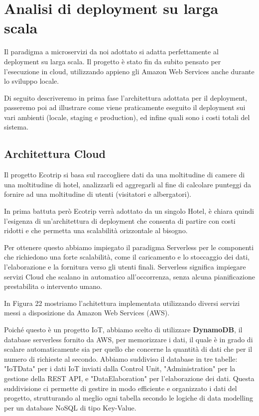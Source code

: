 
\section{Analisi di deployment su larga scala}
Il paradigma a microservizi da noi adottato si adatta perfettamente al deployment su larga scala.
Il progetto è stato fin da subito pensato per l'esecuzione in cloud, utilizzando appieno gli Amazon Web Services anche durante lo sviluppo locale.

Di seguito descriveremo in prima fase l'architettura adottata per il deployment, 
passeremo poi ad illustrare come viene praticamente eseguito il deployment sui vari ambienti (locale, staging e production), 
ed infine quali sono i costi totali del sistema. 

\subsection{Architettura Cloud}

Il progetto Ecotrip si basa sul raccogliere dati da una moltitudine di camere di una moltitudine di hotel, 
analizzarli ed aggregarli al fine di calcolare punteggi da fornire ad una moltitudine di utenti (visitatori e albergatori).

In prima battuta però Ecotrip verrà adottato da un singolo Hotel, è chiara quindi l'esigenza di un'architettura di deployment 
che consenta di partire con costi ridotti e che permetta una scalabilità orizzontale al bisogno.

Per ottenere questo abbiamo impiegato il paradigma Serverless per le componenti che richiedono una forte scalabilità, 
come il caricamento e lo stoccaggio dei dati, l'elaborazione e la fornitura verso gli utenti finali. 
Serverless significa impiegare servizi Cloud che scalano in automatico all'occorrenza, senza alcuna pianificazione prestabilita o intervento umano.

In Figura 22 mostriamo l'achitettura implementata utilizzando diversi servizi messi a disposizione da Amazon Web Services (AWS).

Poiché questo è un progetto IoT, abbiamo scelto di utilizzare \textbf{DynamoDB}, il database serverless fornito da AWS, per memorizzare i dati, il quale è in grado di scalare automaticamente sia per quello che concerne la quantità di dati che per il numero di richieste al secondo.
Abbiamo suddiviso il database in tre tabelle: "IoTData" per i dati IoT inviati dalla Control Unit, "Administration" per la gestione della REST API, e "DataElaboration" per l'elaborazione dei dati. Questa suddivisione ci permette di gestire in modo efficiente e organizzato i dati del progetto, strutturando al meglio ogni tabella secondo le logiche di data modelling per un database NoSQL di tipo Key-Value.

